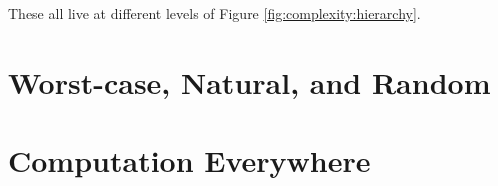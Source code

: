 \documentclass[]{article}
\begin{document}
These all live at different levels of Figure \ref{fig:complexity:hierarchy}.

\section{Worst-case, Natural, and Random}
\cite[Chapters 5,10]{moore2011nature}

\section{Computation Everywhere}
\cite[Chapter 7]{moore2011nature}


\printglossaries

 


\end{document}
